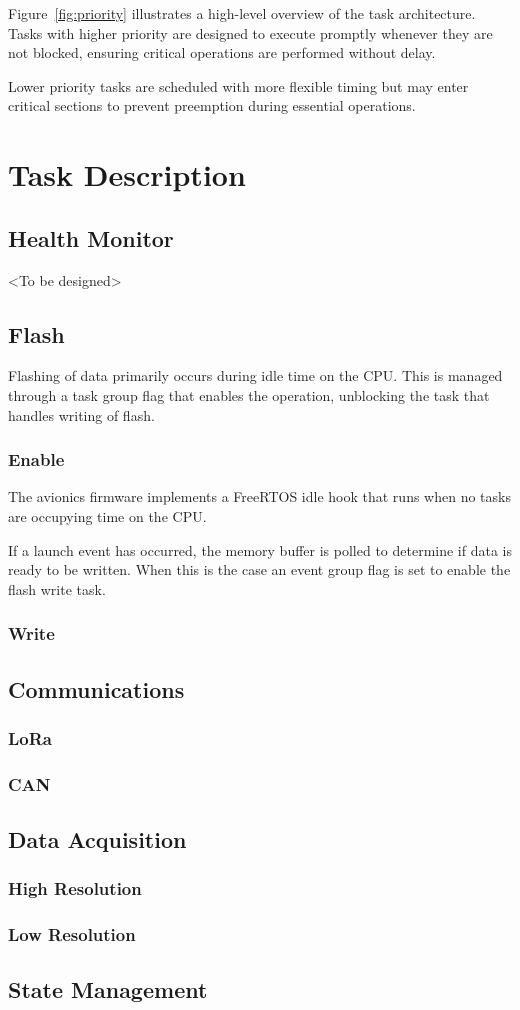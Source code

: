 Figure~\ref{fig:priority}  illustrates a high-level overview of the task architecture. Tasks with higher priority are designed to execute promptly whenever they are not blocked, ensuring critical operations are performed without delay. 

Lower priority tasks are scheduled with more flexible timing but may enter critical sections to prevent preemption during essential operations.

\section{Task Description}

\subsection{Health Monitor}
<To be designed>

\subsection{Flash}
Flashing of data primarily occurs during idle time on the CPU. This is managed through a task group flag that enables the operation, unblocking the task that handles writing of flash.

\subsubsection{Enable}
The avionics firmware implements a FreeRTOS idle hook that runs when no tasks are occupying time on the CPU. 

If a launch event has occurred, the memory buffer is polled to determine if data is ready to be written. When this is the case an event group flag is set to enable the flash write task.

\subsubsection{Write}

\subsection{Communications}
\subsubsection{LoRa}
\subsubsection{CAN}

\subsection{Data Acquisition}
\subsubsection{High Resolution}
\subsubsection{Low Resolution}

\subsection{State Management}

